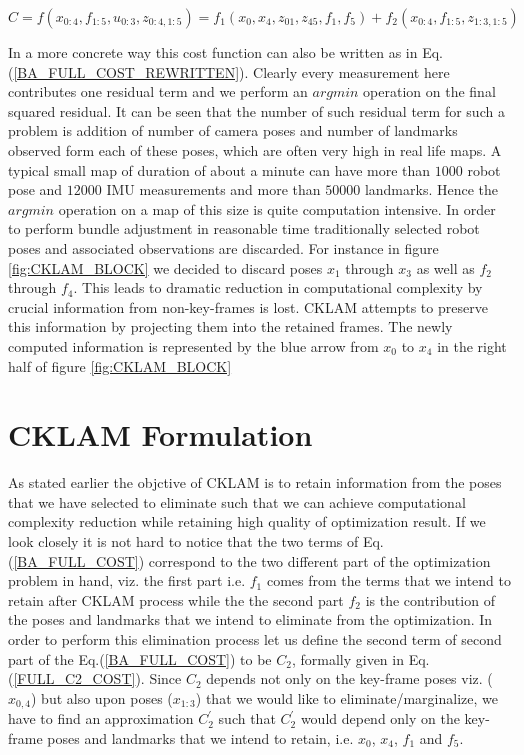 \begin{equation}
  C = f(x_{0:4}, f_{1:5}, u_{0:3}, z_{0:4, 1:5}) = f_1(x_0, x_4, z_{01}, z_{45}, f_1, f_5) + f_2(x_{0:4}, f_{1:5}, z_{1:3, 1:5})
  \label{BA_FULL_COST}
\end{equation}

In a more concrete way this cost function can also be written as in Eq.(\ref{BA_FULL_COST_REWRITTEN}). Clearly every measurement here contributes one residual term and we perform an $argmin$ operation on the final squared residual. It can be seen that the number of such residual term for such a problem is addition of number of camera poses and number of landmarks observed form each of these poses, which are often very high in real life maps. A typical small map of duration of about a minute can have more than $1000$ robot pose and $12000$ IMU measurements and more than $50000$ landmarks. Hence the $argmin$ operation on a map of this size is quite computation intensive. In order to perform bundle adjustment in reasonable time traditionally selected robot poses and associated observations are discarded. For instance in figure \ref{fig:CKLAM_BLOCK} we decided to discard poses $x_1$ through $x_3$ as well as $f_2$ through $f_4$. This leads to dramatic reduction in computational complexity by crucial information from non-key-frames is lost. CKLAM attempts to preserve this information by projecting them into the retained frames. The newly computed information is represented by the blue arrow from $x_0$ to $x_4$ in the right half of figure \ref{fig:CKLAM_BLOCK}

\section{CKLAM Formulation}
As stated earlier the objctive of CKLAM is to retain information from the poses that we have selected to eliminate such that we can achieve computational complexity reduction while retaining high quality of optimization result. If we look closely it is not hard to notice that the two terms of Eq.(\ref{BA_FULL_COST}) correspond to the two different part of the optimization problem in hand, viz. the first part i.e. $f_1$ comes from the terms that we intend to retain after CKLAM process while the the second part $f_2$ is the contribution of the poses and landmarks that we intend to eliminate from the optimization. In order to perform this elimination process let us define the second term of second part of the Eq.(\ref{BA_FULL_COST}) to be $C_2$, formally given in Eq. (\ref{FULL_C2_COST}). 
Since $C_2$ depends not only on the key-frame poses viz. ($x_{0,4}$) but also upon poses ($x_{1:3}$) that we would like to eliminate/marginalize, we have to find an approximation $C_2^'$ such that $C_2^'$ would depend only on the key-frame poses and landmarks that we intend to retain, i.e. $x_0$, $x_4$, $f_1$ and $f_5$. 

